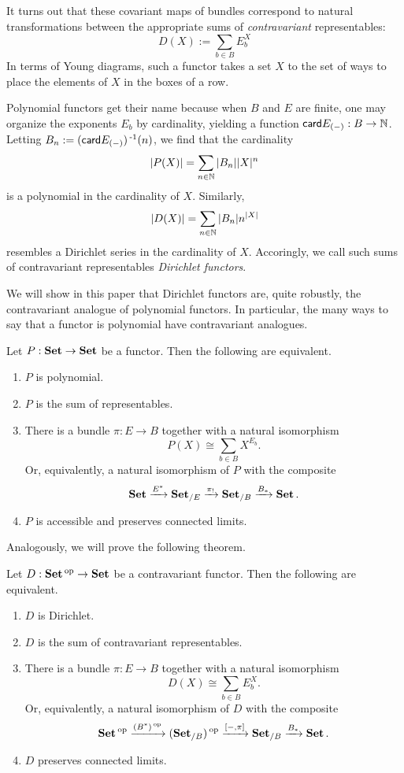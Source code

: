 It turns out that these covariant maps of bundles correspond to natural
transformations between the appropriate sums of \emph{contravariant}
representables:
$$D(X) := \sum_{b \in B} E_b^X$$
In terms of Young diagrams, such a functor takes a set $X$ to the set of ways to
place the elements of $X$ in the boxes of a row.

Polynomial functors get their name because when $B$ and $E$ are finite, one may
organize the exponents $E_b$ by cardinality, yielding a function
$\mathsf{{card}}E_{(-)} : B \to \operatorname{\mathbb{N}}$. Letting $B_n := (\mathsf{{card}}E_{(-)})\operatorname{^{-1}}(n)$,
we find that the cardinality
$$|P(X)| = \sum_{n \in \operatorname{\mathbb{N}}} |B_n||X|^n$$
is a polynomial in the cardinality of $X$. Similarly,
$$|D(X)| = \sum_{n \in \operatorname{\mathbb{N}}} |B_n|n^{|X|}$$
resembles a Dirichlet series in the cardinality of $X$. Accoringly, we call such
sums of contravariant representables \emph{Dirichlet functors}.

We will show in this paper that Dirichlet functors are, quite robustly, the
contravariant analogue of polynomial functors. In particular, the many ways to
say that a functor is polynomial have contravariant analogues.
\begin{thm}[cite]\label{thm:polynomial.set.characterization}
  Let $P : \operatorname{\textbf{Set}} \to \operatorname{\textbf{Set}}$ be a functor. Then the following are equivalent.
  \begin{enumerate}
  \item $P$ is polynomial.
  \item $P$ is the sum of representables.
  \item There is a bundle $\pi : E \to B$ together with a natural isomorphism
    $$P(X) \cong \sum_{b \in B} X^{E_b}.$$
    Or, equivalently, a natural isomorphism of $P$ with the composite
    $$\operatorname{\textbf{Set}} \xrightarrow{E^{\ast}} \operatorname{\textbf{Set}}_{/E} \xrightarrow{\pi_!} \operatorname{\textbf{Set}}_{/B} \xrightarrow{B_\ast} \operatorname{\textbf{Set}}.$$
  \item $P$ is accessible and preserves connected limits.
  \end{enumerate}
\end{thm}

Analogously, we will prove the following theorem.
\begin{thm}\label{thm:dirichlet.set.characterization}
Let $D : \operatorname{\textbf{Set}}\operatorname{^\text{op}} \to \operatorname{\textbf{Set}}$ be a contravariant functor. Then the following are
equivalent.
\begin{enumerate}
\item $D$ is Dirichlet.
\item $D$ is the sum of contravariant representables.
\item There is a bundle $\pi : E \to B$ together with a natural isomorphism
  $$D(X) \cong \sum_{b \in B} E_b^X.$$
  Or, equivalently, a natural isomorphism of $D$ with the composite
  $$\operatorname{\textbf{Set}}\operatorname{^\text{op}} \xrightarrow{(B^{\ast})\operatorname{^\text{op}}} (\operatorname{\textbf{Set}}_{/B})\operatorname{^\text{op}} \xrightarrow{[-, \pi]} \operatorname{\textbf{Set}}_{/B}
  \xrightarrow{B_{\ast}} \operatorname{\textbf{Set}}.$$
\item $D$ preserves connected limits.
\end{enumerate}
\end{thm}

